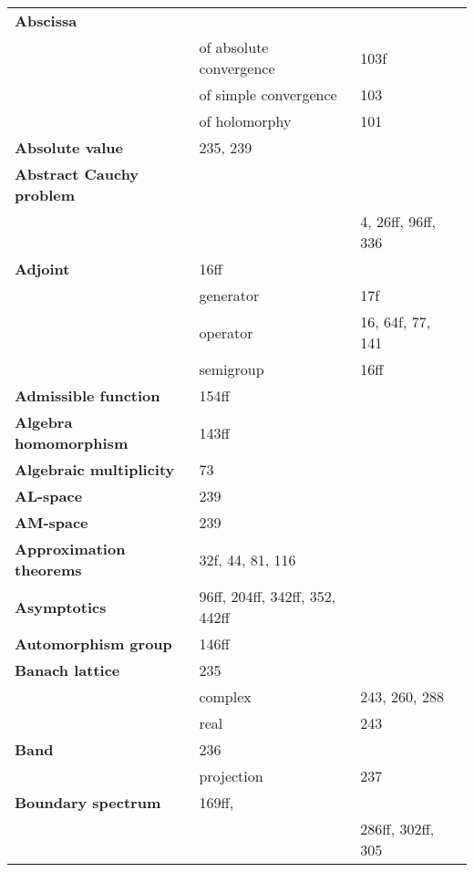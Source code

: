 \documentclass[10pt]{scrartcl}
\begin{document}
\pagestyle{empty}
\begin{longtable}{>{\bfseries}p{4cm}p{4cm}p{4cm}p{4cm}}
Abscissa & \\
& of absolute convergence & 103f \\
& of simple convergence & 103 \\
& of holomorphy & 101 \\
Absolute value & 235, 239 \\
Abstract Cauchy problem & \\
& & 4, 26ff, 96ff, 336 \\
Adjoint & 16ff\\
& generator & 17f \\
& operator & 16, 64f, 77, 141 \\
& semigroup & 16ff \\
Admissible function & 154ff \\
Algebra homomorphism & 143ff \\
Algebraic multiplicity & 73 \\
AL-space & 239 \\
AM-space & 239 \\
Approximation theorems & 32f, 44, 81, 116 \\
Asymptotics & 96ff, 204ff, 342ff, 352, 442ff \\
Automorphism group & 146ff \\

Banach lattice & 235 \\
& complex & 243, 260, 288 \\
& real & 243 \\
Band & 236 \\
& projection & 237 \\
Boundary spectrum & 169ff, \\
& & 286ff, 302ff, 305 \\


\end{longtable}
\end{document}
